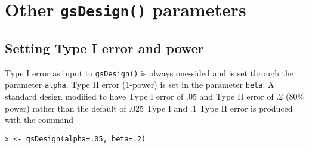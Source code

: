 \section{Other \texttt{gsDesign()} parameters\label{sec:othpar}}
\subsection{Setting Type I error and power}
Type I error as input to \texttt{gsDesign()} is always one-sided and is set through the parameter \texttt{alpha}.
Type II error (1-power) is set in the parameter \texttt{beta}.
A standard design modified to have Type I error of .05  and Type II error of .2 (80\% power) rather than the default of .025 Type I and .1 Type II error is produced with the command
\begin{verbatim}
x <- gsDesign(alpha=.05, beta=.2)
\end{verbatim}

